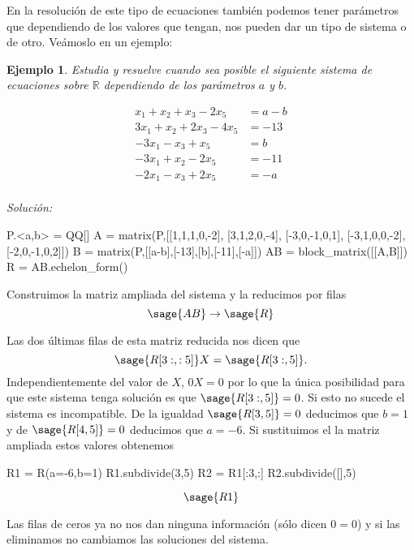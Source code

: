 \documentclass{amsart}
\newtheorem{ejem}{Ejemplo}
\def\r{\mathbb{R}}
\begin{document}

\vspace{1cm}

En la resolución de este tipo de ecuaciones también podemos tener parámetros
que dependiendo de los valores que tengan, nos pueden dar un tipo de sistema
o de otro. Veámoslo en un ejemplo:

\begin{ejem}
Estudia y resuelve cuando sea posible el siguiente sistema de ecuaciones
sobre $\r$ dependiendo de los parámetros $a$ y $b$.

\begin{align*}
x_{1} + x_{2} + x_{3} -2 x_{5} &= a-b\\
3 x_{1} + x_{2} + 2 x_{3} -4 x_{5} &= -13\\
-3 x_{1} - x_{3} + x_{5} &= b\\
-3 x_{1} + x_{2} -2 x_{5} &= -11\\
-2 x_{1} - x_{3} + 2 x_{5} &= -a\\
\end{align*}

\end{ejem}
{\it Solución:}


\begin{sageblock}
P.<a,b> = QQ[]
A =  matrix(P,[[1,1,1,0,-2],
[3,1,2,0,-4],
[-3,0,-1,0,1],
[-3,1,0,0,-2],
[-2,0,-1,0,2]])
B =  matrix(P,[[a-b],[-13],[b],[-11],[-a]])
AB = block_matrix([[A,B]])
R = AB.echelon_form()
\end{sageblock}

Construimos la matriz ampliada del sistema y la reducimos por filas
\[ \sage{AB} \to \sage{R} \]

Las dos últimas filas de esta matriz reducida nos dicen que
\[ \sage{R[3:,:5]} X = \sage{R[3:,5]}. \]
Independientemente del valor de $X$, $0X = 0$ por lo que la única posibilidad
para que este sistema tenga solución es que $\sage{R[3:,5]} = 0$. Si esto no 
sucede el sistema es incompatible. De la igualdad $\sage{R[3,5]} = 0$
deducimos que $b = 1$ y de $\sage{R[4,5]} = 0$ deducimos que $a = -6$. 
Si sustituimos el la matriz ampliada estos valores obtenemos

\begin{sageblock}
R1 = R(a=-6,b=1)
R1.subdivide(3,5)
R2 = R1[:3,:]
R2.subdivide([],5)
\end{sageblock}
 
\[ \sage{R1} \]

Las filas de ceros ya no nos dan ninguna información (sólo dicen $0=0$) y si 
las eliminamos no cambiamos las soluciones del sistema. 
\end{document}
